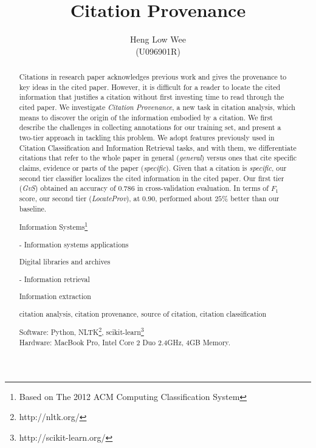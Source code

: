 \documentclass[hyp, 12pt]{socreport}
\begin{document}
\title{Citation Provenance}
\author{Heng Low Wee \\ (U096901R)}
\maketitle
\begin{abstract}
Citations in research paper acknowledges previous work and gives the provenance to key ideas in the cited paper. However, it is difficult for a reader to locate the cited information that justifies a citation without first investing time to read through the cited paper. We investigate {\it Citation Provenance}, a new task in citation analysis, which means to discover the origin of the information embodied by a citation. We first describe the challenges in collecting annotations for our training set, and present a two-tier approach in tackling this problem. We adopt features previously used in Citation Classification and Information Retrieval tasks, and with them, we differentiate citations that refer to the whole paper in general ({\it general}) versus ones that cite specific claims, evidence or parts of the paper ({\it specific}).  Given that a citation is {\it specific}, our second tier classifier localizes the cited information in the cited paper. Our first tier ({\it GvS}) obtained an accuracy of $0.786$ in cross-validation evaluation. In terms of $F_1$ score, our second tier ({\it LocateProv}), at $0.90$, performed about $25\%$ better than our baseline. 

\begin{descriptors}
	\item Information Systems\footnote{Based on The 2012 ACM Computing Classification System}
	{\setlength\itemindent{30pt} \item - Information systems applications}
	{\setlength\itemindent{50pt} \item Digital libraries and archives}
	{\setlength\itemindent{30pt} \item - Information retrieval}
	{\setlength\itemindent{50pt} \item Information extraction}
\end{descriptors}
\begin{keywords}
	citation analysis, citation provenance, source of citation, citation classification
\end{keywords}
\begin{implement}
\begin{flushleft}
\hspace{5 mm}Software: Python, NLTK\footnote{http://nltk.org/}, scikit-learn\footnote{http://scikit-learn.org/} \nocite{scikit-learn}\\
\hspace{5 mm}Hardware: MacBook Pro, Intel Core 2 Duo 2.4GHz, 4GB Memory.
\end{flushleft}
\end{implement}
\end{abstract}
\end{document}
